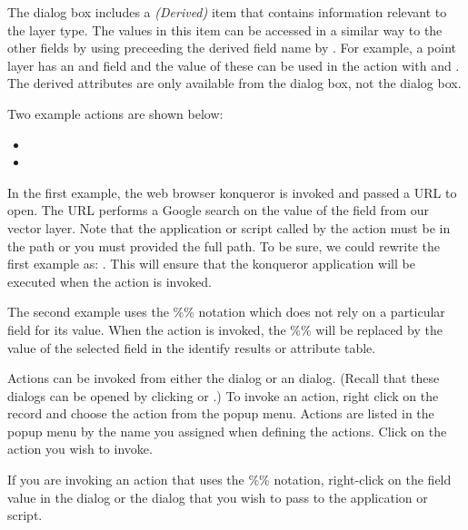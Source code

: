 The  dialog box includes a {\em (Derived)} item that
contains information relevant to the layer type. The
values in this item can be accessed in a similar way to the other fields
by using preceeding the derived field name by . For
example, a point layer has an  and  field and the
value of these can be used in the action with  and
. The derived attributes are only available from the
 dialog box, not the  dialog box.

Two example actions are shown below:

\begin{itemize}
  \item {}
  \item {}
\end{itemize}

In the first example, the web browser konqueror is invoked and passed a URL to
open. The URL performs a Google search on the value of the  field
from our vector layer. Note that the application or script called by the
action must be in the path or you must provided the full path. To be sure, we could
rewrite the first example as: . This will ensure that the konqueror
application will be executed when the action is invoked.

The second example uses the \%\% notation which does not rely on a particular
field for its value. When the action is invoked, the \%\% will be replaced by
the value of the selected field in the identify results or attribute table.

\label{label_usingactions}

Actions can be invoked from either the  dialog or an
 dialog. (Recall that these dialogs can be opened by
clicking  or
.) To invoke an action,
right click on the record and choose the action from the popup menu. Actions
are listed in the popup menu by the name you assigned when defining the
actions. Click on the action you wish to invoke.

If you are invoking an action that uses the \%\% notation, right-click on the
field value in the  dialog or the
 dialog that you wish to pass to the application or script.

